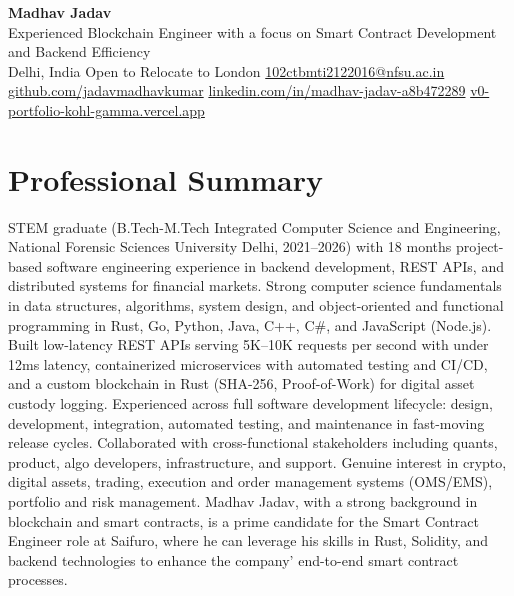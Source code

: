 \documentclass[9pt,letterpaper]{article}
\begin{document}
\begin{center}
{\LARGE \textbf{Madhav Jadav}}\\[2pt]
{\small Experienced Blockchain Engineer with a focus on Smart Contract Development and Backend Efficiency}\\[2pt]
{\small Delhi, India \textbar{} Open to Relocate to London \textbar{} \href{mailto:102ctbmti2122016@nfsu.ac.in}{102ctbmti2122016@nfsu.ac.in}}\\[2pt]
{\small \href{https://github.com/jadavmadhavkumar}{github.com/jadavmadhavkumar} \textbar{} \href{https://www.linkedin.com/in/madhav-jadav-a8b472289}{linkedin.com/in/madhav-jadav-a8b472289} \textbar{} \href{http://v0-portfolio-kohl-gamma.vercel.app}{v0-portfolio-kohl-gamma.vercel.app}}\\
\end{center}

\section{Professional Summary}
STEM graduate (B.Tech-M.Tech Integrated Computer Science and Engineering, National Forensic Sciences University Delhi, 2021--2026) with 18 months project-based software engineering experience in backend development, REST APIs, and distributed systems for financial markets. Strong computer science fundamentals in data structures, algorithms, system design, and object-oriented and functional programming in Rust, Go, Python, Java, C++, C\#, and JavaScript (Node.js). Built low-latency REST APIs serving 5K--10K requests per second with under 12ms latency, containerized microservices with automated testing and CI/CD, and a custom blockchain in Rust (SHA-256, Proof-of-Work) for digital asset custody logging. Experienced across full software development lifecycle: design, development, integration, automated testing, and maintenance in fast-moving release cycles. Collaborated with cross-functional stakeholders including quants, product, algo developers, infrastructure, and support. Genuine interest in crypto, digital assets, trading, execution and order management systems (OMS/EMS), portfolio and risk management. Madhav Jadav, with a strong background in blockchain and smart contracts, is a prime candidate for the Smart Contract Engineer role at Saifuro, where he can leverage his skills in Rust, Solidity, and backend technologies to enhance the company' end-to-end smart contract processes.
\end{document}
